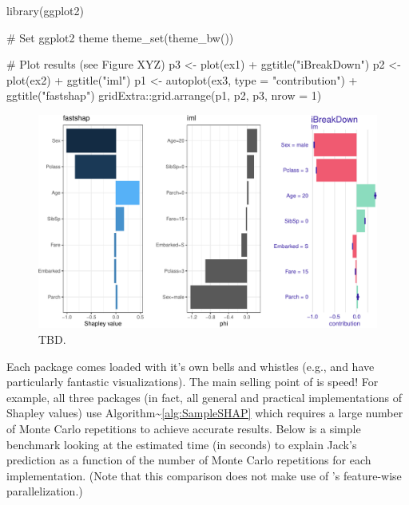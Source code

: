 \begin{Schunk}
\begin{Sinput}
library(ggplot2)

# Set ggplot2 theme
theme_set(theme_bw())

# Plot results (see Figure XYZ)
p3 <- plot(ex1) + ggtitle("iBreakDown")
p2 <- plot(ex2) + ggtitle("iml")
p1 <- autoplot(ex3, type = "contribution") + ggtitle("fastshap")
gridExtra::grid.arrange(p1, p2, p3, nrow = 1)
\end{Sinput}
\begin{figure}[!htb]

{\centering \includegraphics[width=1\linewidth]{greenwell_files/figure-latex/titanic-jack-explanations-plot-1} 

}

\caption[TBD]{TBD.}\label{fig:titanic-jack-explanations-plot}
\end{figure}
\end{Schunk}

Each package comes loaded with it's own bells and whistles (e.g.,
 and  have particularly fantastic
visualizations). The main selling point of  is speed! For
example, all three packages (in fact, all general and practical
implementations of Shapley values) use
Algorithm\textasciitilde{}\ref{alg:SampleSHAP} which requires a large
number of Monte Carlo repetitions to achieve accurate results. Below is
a simple benchmark looking at the estimated time (in seconds) to explain
Jack's prediction as a function of the number of Monte Carlo repetitions
for each implementation. (Note that this comparison does not make use of
's feature-wise parallelization.)

